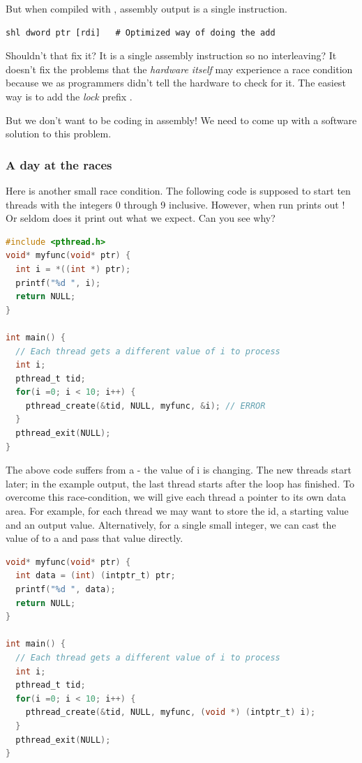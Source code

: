 But when compiled with , assembly output is a single instruction.

\begin{lstlisting}[language={[x86masm]Assembler}]
shl dword ptr [rdi]   # Optimized way of doing the add
\end{lstlisting}

Shouldn't that fix it? It is a single assembly instruction so no interleaving?
It doesn't fix the problems that the \textit{hardware itself} may experience a race condition because we as programmers didn't tell the hardware to check for it.
The easiest way is to add the \textit{lock} prefix \cite[p. 1120]{guide2011intel}.

But we don't want to be coding in assembly!
We need to come up with a software solution to this problem.

\subsubsection{A day at the races}

Here is another small race condition.
The following code is supposed to start ten threads with the integers 0 through 9 inclusive.
However, when run prints out !
Or seldom does it print out what we expect.
Can you see why?

\begin{lstlisting}[language=C]
#include <pthread.h>
void* myfunc(void* ptr) {
  int i = *((int *) ptr);
  printf("%d ", i);
  return NULL;
}

int main() {
  // Each thread gets a different value of i to process
  int i;
  pthread_t tid;
  for(i =0; i < 10; i++) {
    pthread_create(&tid, NULL, myfunc, &i); // ERROR
  }
  pthread_exit(NULL);
}
\end{lstlisting}

The above code suffers from a  - the value of i is changing.
The new threads start later; in the example output, the last thread starts after the loop has finished.
To overcome this race-condition, we will give each thread a pointer to its own data area.
For example, for each thread we may want to store the id, a starting value and an output value.
Alternatively, for a single small integer, we can cast the value of  to a  and pass that value directly.

\begin{lstlisting}[language=C]
void* myfunc(void* ptr) {
  int data = (int) (intptr_t) ptr;
  printf("%d ", data);
  return NULL;
}

int main() {
  // Each thread gets a different value of i to process
  int i;
  pthread_t tid;
  for(i =0; i < 10; i++) {
    pthread_create(&tid, NULL, myfunc, (void *) (intptr_t) i);
  }
  pthread_exit(NULL);
}
\end{lstlisting}

